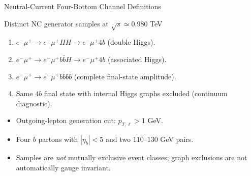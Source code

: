 \documentclass[aspectratio=1610,english]{beamer}
\newcommand{\src}[1]{\vfill{\par\color{black!65}\fontsize{6.4}{7.4}\selectfont\emph{Source:} #1\par}}
\begin{document}
\begin{frame}[t]{Neutral-Current Four-Bottom Channel Definitions}
\small

\begin{block}{Distinct NC generator samples at $\sqrt{s}\simeq0.980$ TeV}
\begin{enumerate}
\justifying 
\item $e^-\mu^+\to e^-\mu^+HH\to e^-\mu^+4b$ (double Higgs).
\item $e^-\mu^+\to e^-\mu^+b\bar b H\to e^-\mu^+4b$ (associated Higgs).
\item $e^-\mu^+\to e^-\mu^+b\bar b b\bar b$ (complete final-state amplitude).
\item Same $4b$ final state with internal Higgs graphs excluded (continuum diagnostic).
\end{enumerate}
\end{block}
\begin{itemize}
\justifying 
\item Outgoing-lepton generation cut: $p_{T,\ell}>1$ GeV.
\item Four $b$ partons with $|\eta_b|<5$ and two $110$--$130$ GeV pairs.
\item Samples are \emph{not} mutually exclusive event classes; graph exclusions are not automatically gauge invariant.
\end{itemize}

\end{frame}
\end{document}
